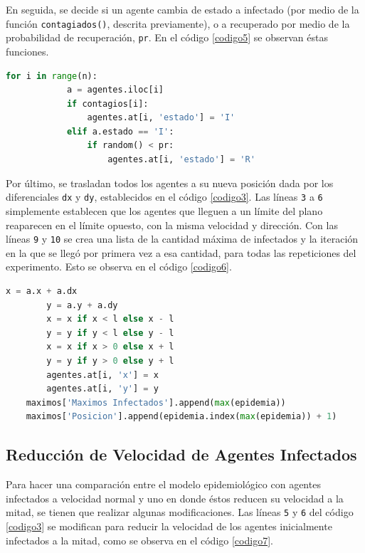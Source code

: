 \documentclass{article}
\begin{document}
En seguida, se decide si un agente cambia de estado a infectado (por medio de la funci\'on \texttt{contagiados()}, descrita previamente), o a recuperado por medio de la probabilidad de recuperaci\'on, \texttt{pr}. En el c\'odigo \ref{codigo5} se observan \'estas funciones.

\begin{lstlisting}[caption=Decisi\'on de Agentes Infectados y Recuperados, label=codigo5, language=Python]
        for i in range(n):
            a = agentes.iloc[i]
            if contagios[i]:
                agentes.at[i, 'estado'] = 'I'
            elif a.estado == 'I':
                if random() < pr:
                    agentes.at[i, 'estado'] = 'R'
\end{lstlisting}

Por \'ultimo, se trasladan todos los agentes a su nueva posici\'on dada por los diferenciales \texttt{dx} y \texttt{dy}, establecidos en el c\'odigo \ref{codigo3}. Las l\'ineas \texttt{3} a \texttt{6} simplemente establecen que los agentes que lleguen a un l\'imite del plano reaparecen en el l\'imite opuesto, con la misma velocidad y direcci\'on. Con las l\'ineas \texttt{9} y \texttt{10} se crea una lista de la cantidad m\'axima de infectados y la iteraci\'on en la que se lleg\'o por primera vez a esa cantidad, para todas las repeticiones del experimento. Esto se observa en el c\'odigo \ref{codigo6}.

\begin{lstlisting}[caption=Movimiento de los Agentes, label=codigo6, language=Python]
        x = a.x + a.dx
        y = a.y + a.dy
        x = x if x < l else x - l
        y = y if y < l else y - l
        x = x if x > 0 else x + l
        y = y if y > 0 else y + l
        agentes.at[i, 'x'] = x
        agentes.at[i, 'y'] = y
    maximos['Maximos Infectados'].append(max(epidemia))
    maximos['Posicion'].append(epidemia.index(max(epidemia)) + 1)
\end{lstlisting}

\subsection{Reducci\'on de Velocidad de Agentes Infectados}

Para hacer una comparaci\'on entre el modelo epidemiol\'ogico con agentes infectados a velocidad normal y uno en donde \'estos reducen su velocidad a la mitad, se tienen que realizar algunas modificaciones. Las l\'ineas \texttt{5} y \texttt{6} del c\'odigo \ref{codigo3} se modifican para reducir la velocidad de los agentes inicialmente infectados a la mitad, como se observa en el c\'odigo \ref{codigo7}.
\end{document}
